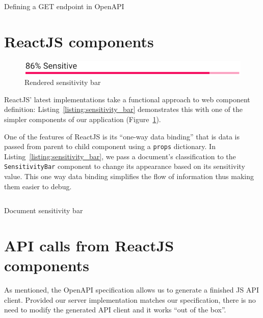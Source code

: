 \documentclass[\version]{l4proj}
\begin{document}
\begin{listing}[H]
    \inputminted{yaml}{code/getPredictedClassification.yml}
    \caption{Defining a GET endpoint in OpenAPI}\label{listing:getPredictedClassification_yml}
\end{listing}

\section{ReactJS components}

\begin{figure}
    \includegraphics[width=\linewidth]{figures/sensitivity_bar.pdf}
    \caption{Rendered sensitivity bar}\label{fig:sensitivity_bar_preview}
    \vspace{-10pt}
\end{figure}

ReactJS' latest implementations take a functional approach to web component definition: Listing~\ref{listing:sensitivity_bar} demonstrates this with one of the simpler components of our application (Figure~\ref{fig:sensitivity_bar_preview}).

One of the features of ReactJS is its ``one-way data binding'' that is data is passed from parent to child component using a \verb|props| dictionary.
In Listing~\ref{listing:sensitivity_bar}, we pass a document's classification to the \verb|SensitivityBar| component to change its appearance based on its sensitivity value.
This one way data binding simplifies the flow of information thus making them easier to debug.


\begin{listing}[H]
    \inputminted{jsx}{code/documentSensitivityBar.jsx}
    \caption{Document sensitivity bar}\label{listing:sensitivity_bar}
\end{listing}

\section{API calls from ReactJS components}

As mentioned, the OpenAPI specification allows us to generate a finished JS API client.
Provided our server implementation matches our specification, there is no need to modify the generated API client and it works ``out of the box''.
\end{document}
